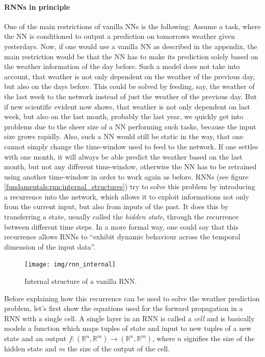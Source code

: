 \paragraph{RNNs in principle}
One of the main restrictions of vanilla NNs is the following: Assume a task, where the NN is conditioned to output a prediction on tomorrows weather given yesterdays. Now, if one would use a vanilla NN as described in the appendix, the main restriction would be that the NN has to make its prediction solely based on the weather information of the day before. Such a model does not take into account, that weather is not only dependent on the weather of the previous day, but also on the days before. This could be solved by feeding, say, the weather of the last week to the network instead of just the weather of the previous day. But if new scientific evident now shows, that weather is not only dependent on last week, but also on the last month, probably the last year, we quickly get into problems due to the sheer size of a NN performing such tasks, because the input size grows rapidly. Also, such a NN would still be static in the way, that one cannot simply change the time-window used to feed to the network. If one settles with one month, it will always be able predict the weather based on the last month, but not any different time-window, otherwise the NN has to be retrained using another time-window in order to work again as before. RNNs (see figure \ref{fundamentals:rnn:internal_structures}) try to solve this problem by introducing a recurrence into the network, which allows it to exploit informations not only from the current input, but also from inputs of the past. It does this by transferring a state, usually called the \emph{hidden state}, through the recurrence between different time steps. In a more formal way, one could say that this recurrence allows RNNs to ``exhibit dynamic behaviour across the temporal dimension of the input data''.

\begin{figure}[h]
	\label{fundamentals:rnn:internal_structure}
	\centering
	\texttt{[image: img/rnn\_internal]}
	\caption{Internal structure of a vanilla RNN.\protect\footnotemark}
\end{figure}

Before explaining how this recurrence can be used to solve the weather prediction problem, let's first show the equations used for the forward propagation in a RNN with a single cell. A single layer in an RNN is called a \emph{cell} and is basically models a function which maps tuples of state and input to new tuples of a new state and an output $f: (\mathbb{R}^n, \mathbb{R}^m) \rightarrow (\mathbb{R}^n, \mathbb{R}^m)$, where $n$ signifies the size of the hidden state and $m$ the size of the output of the cell.

